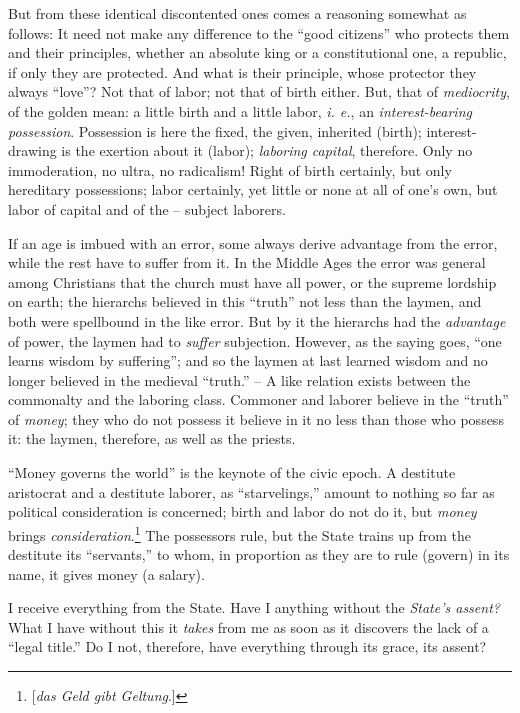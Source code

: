 \documentclass[12pt,a4paper]{book}
\begin{document}
But from these identical discontented ones comes a reasoning somewhat as 
follows: It need not make any difference to the ``good citizens'' who 
protects them and their principles, whether an absolute king or a 
constitutional one, a republic, if only they are protected. And what is their 
principle, whose protector they always ``love''? Not that of labor; not that 
of birth either. But, that of \textit{mediocrity}, of the golden mean: a 
little birth and a little labor, \textit{i. e.}, an \textit{interest-bearing 
possession}. Possession is here the fixed, the given, inherited (birth); 
interest-drawing is the exertion about it (labor); \textit{laboring capital}, 
therefore. Only no immoderation, no ultra, no radicalism! Right of birth 
certainly, but only hereditary possessions; labor certainly, yet little or 
none at all of one's own, but labor of capital and of the -- subject laborers.

If an age is imbued with an error, some always derive advantage from the 
error, while the rest have to suffer from it. In the Middle Ages the error was 
general among Christians that the church must have all power, or the supreme 
lordship on earth; the hierarchs believed in this ``truth'' not less than 
the laymen, and both were spellbound in the like error. But by it the 
hierarchs had the \textit{advantage} of power, the laymen had to 
\textit{suffer} subjection. However, as the saying goes, ``one learns wisdom 
by suffering''; and so the laymen at last learned wisdom and no longer 
believed in the medieval ``truth.'' -- A like relation exists between the 
commonalty and the laboring class. Commoner and laborer believe in the 
``truth'' of \textit{money}; they who do not possess it believe in it no 
less than those who possess it: the laymen, therefore, as well as the priests.

``Money governs the world'' is the keynote of the civic epoch. A destitute 
aristocrat and a destitute laborer, as ``starvelings,'' amount to nothing so 
far as political consideration is concerned; birth and labor do not do it, but 
\textit{money} brings \textit{consideration}.\footnote{[\textit{das Geld gibt 
Geltung}.]} The possessors rule, but the State trains up from the destitute 
its ``servants,'' to whom, in proportion as they are to rule (govern) in its 
name, it gives money (a salary).

I receive everything from the State. Have I anything without the 
\textit{State's assent?} What I have without this it \textit{takes} from me as 
soon as it discovers the lack of a ``legal title.'' Do I not, therefore, 
have everything through its grace, its assent?
\end{document}
